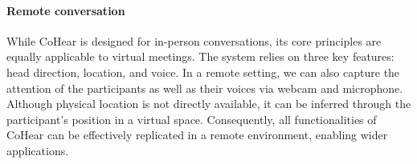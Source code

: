 \paragraph{Remote conversation}
While CoHear is designed for in-person conversations, its core principles are equally applicable to virtual meetings. The system relies on three key features: head direction, location, and voice. In a remote setting, we can also capture the attention of the participants as well as their voices via webcam and microphone. Although physical location is not directly available, it can be inferred through the participant's position in a virtual space. Consequently, all functionalities of CoHear can be effectively replicated in a remote environment, enabling wider applications.

